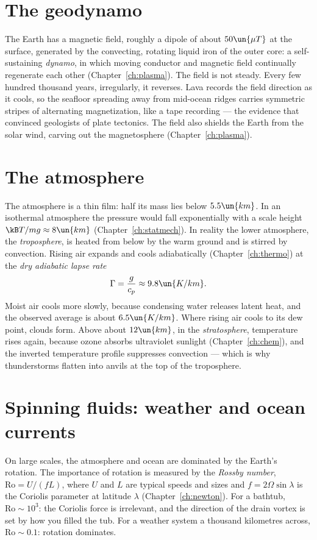 \section{The geodynamo}

The Earth has a magnetic field, roughly a dipole of about $50\un{\mu T}$ at the surface, generated by the convecting, rotating liquid iron of the outer core: a self-sustaining \emph{dynamo}, in which moving conductor and magnetic field continually regenerate each other (Chapter~\ref{ch:plasma}). The field is not steady. Every few hundred thousand years, irregularly, it reverses. Lava records the field direction as it cools, so the seafloor spreading away from mid-ocean ridges carries symmetric stripes of alternating magnetization, like a tape recording --- the evidence that convinced geologists of plate tectonics. The field also shields the Earth from the solar wind, carving out the magnetosphere (Chapter~\ref{ch:plasma}).

\section{The atmosphere}

The atmosphere is a thin film: half its mass lies below $5.5\un{km}$. In an isothermal atmosphere the pressure would fall exponentially with a scale height $\kB T/mg\approx8\un{km}$ (Chapter~\ref{ch:statmech}). In reality the lower atmosphere, the \emph{troposphere}, is heated from below by the warm ground and is stirred by convection. Rising air expands and cools adiabatically (Chapter~\ref{ch:thermo}) at the \emph{dry adiabatic lapse rate}
\[
  \Gamma = \frac{g}{c_p}\approx9.8\un{K/km}.
\]
Moist air cools more slowly, because condensing water releases latent heat, and the observed average is about $6.5\un{K/km}$. Where rising air cools to its dew point, clouds form. Above about $12\un{km}$, in the \emph{stratosphere}, temperature rises again, because ozone absorbs ultraviolet sunlight (Chapter~\ref{ch:chem}), and the inverted temperature profile suppresses convection --- which is why thunderstorms flatten into anvils at the top of the troposphere.

\section{Spinning fluids: weather and ocean currents}

On large scales, the atmosphere and ocean are dominated by the Earth's rotation. The importance of rotation is measured by the \emph{Rossby number}, $\mathrm{Ro} = U/(fL)$, where $U$ and $L$ are typical speeds and sizes and $f = 2\Omega\sin\lambda$ is the Coriolis parameter at latitude $\lambda$ (Chapter~\ref{ch:newton}). For a bathtub, $\mathrm{Ro}\sim10^3$: the Coriolis force is irrelevant, and the direction of the drain vortex is set by how you filled the tub. For a weather system a thousand kilometres across, $\mathrm{Ro}\sim0.1$: rotation dominates.

